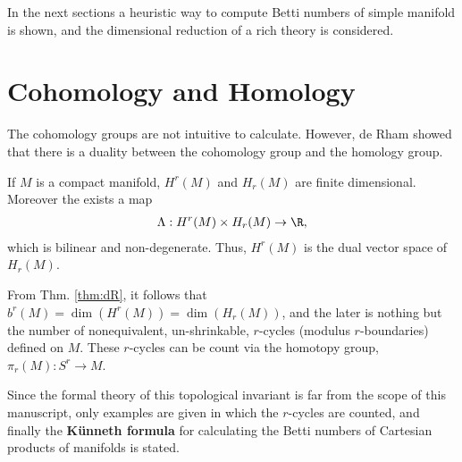 In the next sections a heuristic way to compute Betti numbers of simple manifold is shown, and the dimensional reduction of a rich theory is considered.


\section{Cohomology and Homology}

The cohomology groups are not intuitive to calculate. However, de Rham showed that there is a duality between the cohomology group and the homology group.


\begin{Thm}\label{thm:dR}
  If $M$ is a compact manifold, $H^r (M)$ and
  $H_r (M)$ are finite dimensional. Moreover the exists a map
  \begin{align}
    \Lambda    : H^r (M) \times H_r (M) \to \R,
  \end{align}
  which is bilinear and non-degenerate. Thus, $H^ r (M)$ is the dual vector space of $H_r (M)$.
\end{Thm}

From Thm. \ref{thm:dR}, it follows that $b^r(M)=\dim(H^r(M)) = \dim(H_r(M))$, and the later is nothing but the number of nonequivalent, un-shrinkable, $r$-cycles (modulus $r$-boundaries) defined on $M$.  These $r$-cycles can be count via the homotopy group, $\pi_r(M):S^r\to M$.


      
      

Since the formal theory of this topological invariant is far from the scope of this manuscript, only examples are given in which the $r$-cycles are counted, and finally the {\bf K\"unneth formula} for calculating the Betti numbers of Cartesian products of manifolds is stated.

